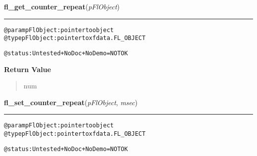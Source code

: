     \label{xformslib:flcounter:fl_get_counter_repeat}

    \vspace{0.5ex}

\hspace{.8\funcindent}\begin{boxedminipage}{\funcwidth}

    \raggedright \textbf{fl\_get\_counter\_repeat}(\textit{pFlObject})

    \vspace{-1.5ex}

    \rule{\textwidth}{0.5\fboxrule}
\setlength{\parskip}{2ex}
\begin{alltt}
@param pFlObject: pointer to object
@type pFlObject: pointer to xfdata.FL\_OBJECT

        @status: Untested + NoDoc + NoDemo = NOT OK
    
\end{alltt}

\setlength{\parskip}{1ex}
      \textbf{Return Value}
    \vspace{-1ex}

      \begin{quote}
      num

      \end{quote}

    \end{boxedminipage}

    \label{xformslib:flcounter:fl_set_counter_repeat}

    \vspace{0.5ex}

\hspace{.8\funcindent}\begin{boxedminipage}{\funcwidth}

    \raggedright \textbf{fl\_set\_counter\_repeat}(\textit{pFlObject}, \textit{msec})

    \vspace{-1.5ex}

    \rule{\textwidth}{0.5\fboxrule}
\setlength{\parskip}{2ex}
\begin{alltt}
        @param pFlObject: pointer to object
@type pFlObject: pointer to xfdata.FL\_OBJECT

        @status: Untested + NoDoc + NoDemo = NOT OK
    
\end{alltt}

\setlength{\parskip}{1ex}
    \end{boxedminipage}

